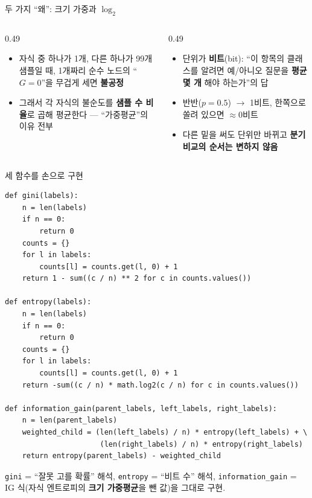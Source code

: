 \documentclass[aspectratio=169,11pt]{beamer}
\begin{document}
\begin{frame}{두 가지 ``왜'': 크기 가중과 $\log_2$}
  \begin{columns}[T]
    \begin{column}{0.49\textwidth}
      \begin{itemize}
        \item 자식 중 하나가 1개, 다른 하나가 99개 샘플일 때,
          1개짜리 순수 노드의 ``$G=0$''을 무겁게 세면 \textbf{불공정}
        \item 그래서 각 자식의 불순도를 \textbf{샘플 수 비율}로 곱해
          평균한다 — ``가중평균''의 이유 전부
      \end{itemize}
    \end{column}
    \begin{column}{0.49\textwidth}
      \begin{itemize}
        \item 단위가 \textbf{비트}(bit): ``이 항목의 클래스를 알려면
          예/아니오 질문을 \textbf{평균 몇 개} 해야 하는가''의 답
        \item 반반($p=0.5$) $\to$ 1비트, 한쪽으로 쏠려 있으면 $\approx 0$비트
        \item 다른 밑을 써도 단위만 바뀌고 \textbf{분기 비교의 순서는
          변하지 않음}
      \end{itemize}
    \end{column}
  \end{columns}
\end{frame}

\begin{frame}[fragile]{세 함수를 손으로 구현}
\begin{lstlisting}
def gini(labels):
    n = len(labels)
    if n == 0:
        return 0
    counts = {}
    for l in labels:
        counts[l] = counts.get(l, 0) + 1
    return 1 - sum((c / n) ** 2 for c in counts.values())

def entropy(labels):
    n = len(labels)
    if n == 0:
        return 0
    counts = {}
    for l in labels:
        counts[l] = counts.get(l, 0) + 1
    return -sum((c / n) * math.log2(c / n) for c in counts.values())

def information_gain(parent_labels, left_labels, right_labels):
    n = len(parent_labels)
    weighted_child = (len(left_labels) / n) * entropy(left_labels) + \
                      (len(right_labels) / n) * entropy(right_labels)
    return entropy(parent_labels) - weighted_child
\end{lstlisting}
  {\footnotesize \texttt{gini} = ``잘못 고를 확률'' 해석, \texttt{entropy} =
  ``비트 수'' 해석, \texttt{information\_gain} = IG 식(자식 엔트로피의
  \textbf{크기 가중평균}을 뺀 값)을 그대로 구현.}
\end{frame}
\end{document}
